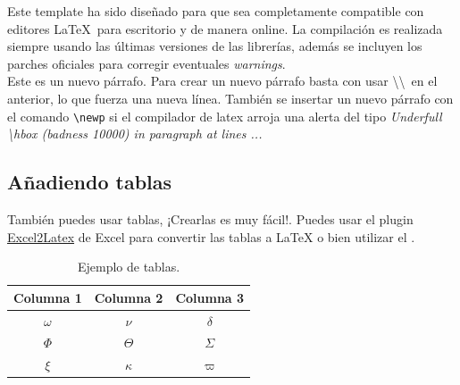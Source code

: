 
	Este template ha sido diseñado para que sea completamente compatible con editores \LaTeX\ para escritorio y de manera online. La compilación es realizada siempre usando las últimas versiones de las librerías, además se incluyen los parches oficiales para corregir eventuales \textit{warnings}. \\

	Este es un nuevo párrafo. Para crear un nuevo párrafo basta con usar \textbackslash\textbackslash\ en el anterior, lo que fuerza una nueva línea. También se insertar un nuevo párrafo con el comando \texttt{\textbackslash newp} si el compilador de latex arroja una alerta del tipo \textit{Underfull \textbackslash hbox (badness 10000) in paragraph at lines ...}

\subsection{Añadiendo tablas}

	También puedes usar tablas, ¡Crearlas es muy fácil!. Puedes usar el plugin \href{https://www.ctan.org/tex-archive/support/excel2latex}{Excel2Latex} \cite{excel2latex} de Excel para convertir las tablas a \LaTeX\xspace o bien utilizar el  \cite{tablesgenerator}.

	\begin{table}[H]
		\centering
		\caption{Ejemplo de tablas.}
		\begin{tabular}{ccc}
			\hline
			\textbf{Columna 1} & \textbf{Columna 2} & \textbf{Columna 3} \bigstrut\\
			\hline
			$\omega$ & $\nu$ & $\delta$ \bigstrut[t]\\
			$\Phi$ & $\Theta$ & $\varSigma$ \\
			$\xi$ & $\kappa$ & $\varpi$ \bigstrut[b] \\
			\hline
		\end{tabular}
		\label{tab:tabla-1}
	\end{table}


